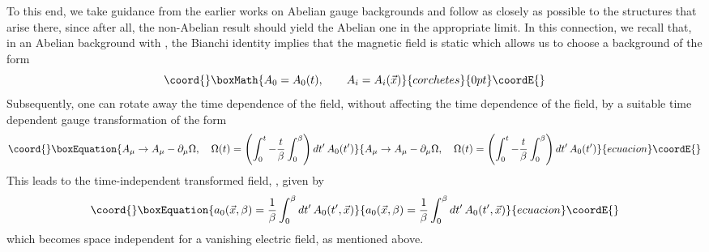 \documentclass[a4paper,12pt]{article}
\begin{document}
To this end, we take guidance from the earlier
works on Abelian gauge backgrounds and follow as closely as
possible to the structures that arise there, since after all, the
non-Abelian result should yield the Abelian one in the appropriate
limit. In this connection, we recall that, in
an Abelian background with \coordHE{}, the Bianchi
identity implies that the magnetic field is static which allows us to
choose a background of the form
\[\coord{}\boxMath{
A_{0} = A_{0}(t),\qquad A_{i} = A_{i}(\vec{x})
}{corchetes}{0pt}\coordE{}\]
Subsequently, one can rotate away the time dependence of the \coordHE{}
field, without affecting the time dependence of the \coordHE{} field, by a
suitable time dependent gauge transformation of the form
\begin{equation}\coord{}\boxEquation{
A_{\mu}\rightarrow A_{\mu} - \partial_{\mu}\Omega,\quad \Omega(t) =
\left(\int_{0}^{t} - {t\over \beta}\int_{0}^{\beta}\right)
dt'\,A_{0}(t')\label{abelian}
}{
A_{\mu}\rightarrow A_{\mu} - \partial_{\mu}\Omega,\quad \Omega(t) =
\left(\int_{0}^{t} - {t\over \beta}\int_{0}^{\beta}\right)
dt'\,A_{0}(t')}{ecuacion}\coordE{}\end{equation}
This leads to the time-independent transformed field,
\coordHE{}, given by
\begin{equation}\coord{}\boxEquation{
a_{0}(\vec{x},\beta) = {1\over \beta} \int_{0}^{\beta}
dt'\,A_{0}(t',\vec{x})\label{abelian1}
}{
a_{0}(\vec{x},\beta) = {1\over \beta} \int_{0}^{\beta}
dt'\,A_{0}(t',\vec{x})}{ecuacion}\coordE{}\end{equation}
which becomes space independent for a vanishing electric field, as
mentioned above.
\end{document}
